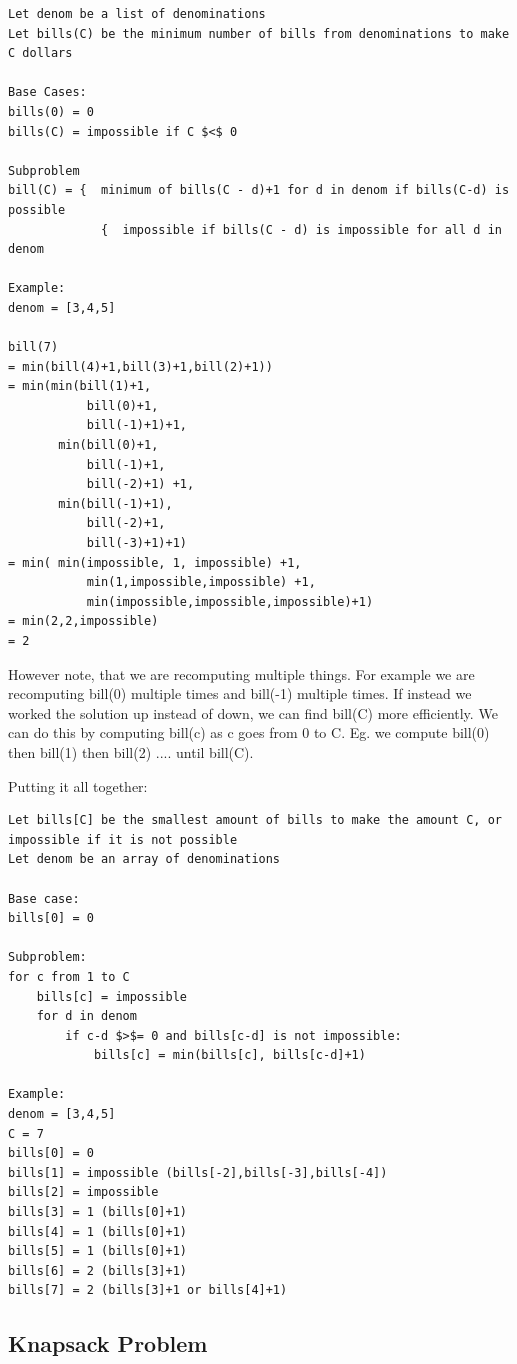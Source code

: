 \documentclass[11pt,oneside]{book}
\begin{document}
\begin{lstlisting}
Let denom be a list of denominations
Let bills(C) be the minimum number of bills from denominations to make C dollars

Base Cases:
bills(0) = 0
bills(C) = impossible if C $<$ 0

Subproblem
bill(C) = {  minimum of bills(C - d)+1 for d in denom if bills(C-d) is possible
             {  impossible if bills(C - d) is impossible for all d in denom

Example:
denom = [3,4,5]

bill(7)
= min(bill(4)+1,bill(3)+1,bill(2)+1))
= min(min(bill(1)+1,
           bill(0)+1,
           bill(-1)+1)+1, 
       min(bill(0)+1,
           bill(-1)+1,
           bill(-2)+1) +1, 
       min(bill(-1)+1),
           bill(-2)+1,
           bill(-3)+1)+1)
= min( min(impossible, 1, impossible) +1,
           min(1,impossible,impossible) +1,
           min(impossible,impossible,impossible)+1)
= min(2,2,impossible)
= 2

\end{lstlisting}

However note, that we are recomputing multiple things. For example we are recomputing bill(0) multiple times and bill(-1) multiple times. If instead we worked the solution up instead of down, we can find bill(C) more efficiently. We can do this by computing bill(c) as c goes from 0 to C. Eg. we compute bill(0) then bill(1) then bill(2) .... until bill(C).

Putting it all together:

\begin{lstlisting}
Let bills[C] be the smallest amount of bills to make the amount C, or impossible if it is not possible
Let denom be an array of denominations

Base case:
bills[0] = 0

Subproblem:
for c from 1 to C
    bills[c] = impossible
    for d in denom
        if c-d $>$= 0 and bills[c-d] is not impossible:
            bills[c] = min(bills[c], bills[c-d]+1)

Example:
denom = [3,4,5]
C = 7
bills[0] = 0
bills[1] = impossible (bills[-2],bills[-3],bills[-4])
bills[2] = impossible 
bills[3] = 1 (bills[0]+1)
bills[4] = 1 (bills[0]+1)
bills[5] = 1 (bills[0]+1)
bills[6] = 2 (bills[3]+1)
bills[7] = 2 (bills[3]+1 or bills[4]+1)
\end{lstlisting}

\subsection{Knapsack Problem}
\end{document}
